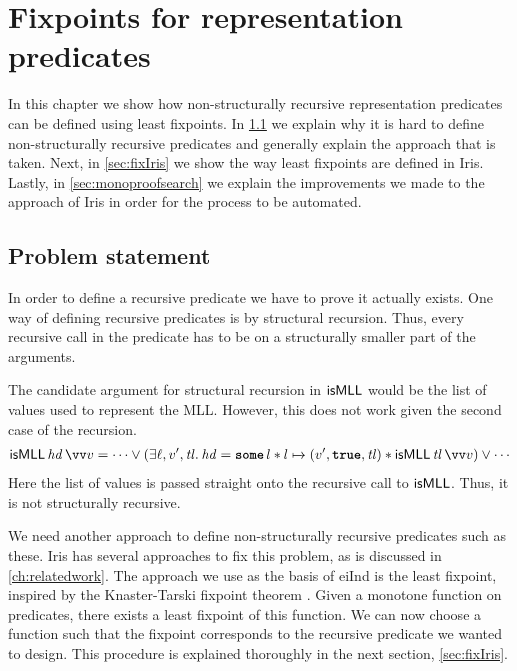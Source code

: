 \documentclass[thesis.tex]{subfiles}
\begin{document}
\chapter{Fixpoints for representation predicates} \label{ch:fixpoints}
In this chapter we show how non-structurally recursive representation predicates can be defined using least fixpoints. In \cref{sec:fixproblem} we explain why it is hard to define non-structurally recursive predicates and generally explain the approach that is taken. Next, in \cref{sec:fixIris} we show the way least fixpoints are defined in Iris. Lastly, in \cref{sec:monoproofsearch} we explain the improvements we made to the approach of Iris in order for the process to be automated.

\section{Problem statement} \label{sec:fixproblem}
In order to define a recursive predicate we have to prove it actually exists. One way of defining recursive predicates is by structural recursion. Thus, every recursive call in the predicate has to be on a structurally smaller part of the arguments.

The candidate argument for structural recursion in $\textsf{\upshape isMLL}$ would be the list of values used to represent the MLL. However, this does not work given the second case of the recursion.
\begin{align*}
  \isMLL\,\hd\,\vect{\val} = \cdots \lor (\Exists \loc, \val', \tl. \hd = \Some l * l \fmapsto (\val', \True, \tl) * \isMLL\, \tl\, \vect{\val}) \lor \cdots
\end{align*}
Here the list of values is passed straight onto the recursive call to $\textsf{\upshape isMLL}$. Thus, it is not structurally recursive.

We need another approach to define non-structurally recursive predicates such as these. Iris has several approaches to fix this problem, as is discussed in \cref{ch:relatedwork}. The approach we use as the basis of eiInd is the least fixpoint, inspired by the Knaster-Tarski fixpoint theorem \cite*{tarskiLatticetheoreticalFixpointTheorem1955}. Given a monotone function on predicates, there exists a least fixpoint of this function. We can now choose a function such that the fixpoint corresponds to the recursive predicate we wanted to design. This procedure is explained thoroughly in the next section, \cref{sec:fixIris}.
\end{document}
